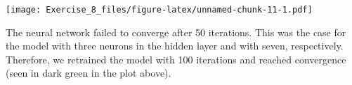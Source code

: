 \documentclass[
]{article}
\begin{document}
\texttt{[image: Exercise\_8\_files/figure-latex/unnamed-chunk-11-1.pdf]}

The neural network failed to converge after 50 iterations. This was the
case for the model with three neurons in the hidden layer and with
seven, respectively. Therefore, we retrained the model with 100
iterations and reached convergence (seen in dark green in the plot
above).
\end{document}
